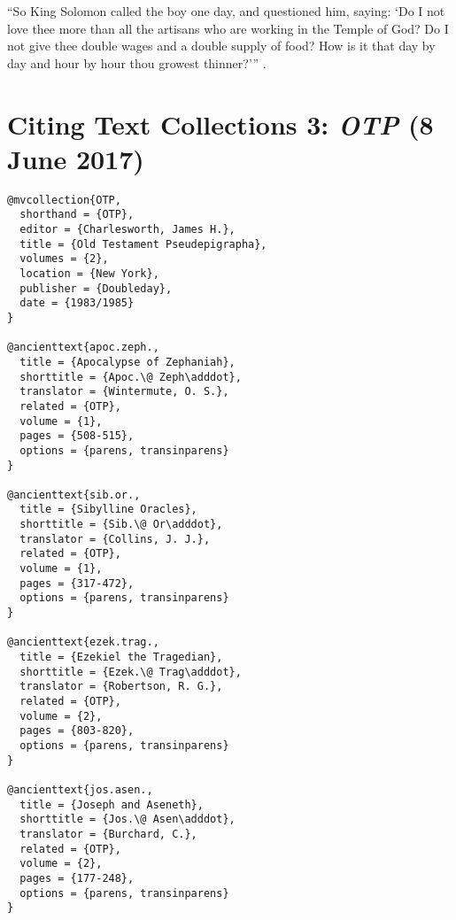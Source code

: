 \documentclass[a4paper]{article}
\renewcommand\footnote[1]{##1}%
\begin{document}
\begin{verbcite}
  “So King Solomon called the boy one day, and questioned him, saying: ‘Do I
  not love thee more than all the artisans who are working in the Temple of
  God? Do I not give thee double wages and a double supply of food? How is it
  that day by day and hour by hour thou growest thinner?’”
  .
\end{verbcite}
\exampleancientsources
\examplesecondarysources
\examplebibliography
{}

\section{Citing Text Collections 3: \emph{OTP} (8 June 2017)}

\begin{verbatim}
@mvcollection{OTP,
  shorthand = {OTP},
  editor = {Charlesworth, James H.},
  title = {Old Testament Pseudepigrapha},
  volumes = {2},
  location = {New York},
  publisher = {Doubleday},
  date = {1983/1985}
}

@ancienttext{apoc.zeph.,
  title = {Apocalypse of Zephaniah},
  shorttitle = {Apoc.\@ Zeph\adddot},
  translator = {Wintermute, O. S.},
  related = {OTP},
  volume = {1},
  pages = {508-515},
  options = {parens, transinparens}
}

@ancienttext{sib.or.,
  title = {Sibylline Oracles},
  shorttitle = {Sib.\@ Or\adddot},
  translator = {Collins, J. J.},
  related = {OTP},
  volume = {1},
  pages = {317-472},
  options = {parens, transinparens}
}

@ancienttext{ezek.trag.,
  title = {Ezekiel the Tragedian},
  shorttitle = {Ezek.\@ Trag\adddot},
  translator = {Robertson, R. G.},
  related = {OTP},
  volume = {2},
  pages = {803-820},
  options = {parens, transinparens}
}

@ancienttext{jos.asen.,
  title = {Joseph and Aseneth},
  shorttitle = {Jos.\@ Asen\adddot},
  translator = {Burchard, C.},
  related = {OTP},
  volume = {2},
  pages = {177-248},
  options = {parens, transinparens}
}
\end{verbatim}
\end{document}
